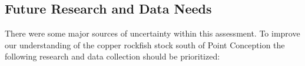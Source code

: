 \documentclass[11pt,
  english,
  a4paper,
]{article}
\begin{document}
\leavevmode\tagmcend\tagstructend\par


\hypertarget{future-research-and-data-needs}{%
\subsection{Future Research and Data Needs}\label{future-research-and-data-needs}}

\leavevmode\tagmcend\tagstructend


There were some major sources of uncertainty within this assessment. To improve our understanding of the copper rockfish stock south of Point Conception the following research and data collection should be prioritized:

\leavevmode\tagmcend\tagstructend\par
\end{document}
